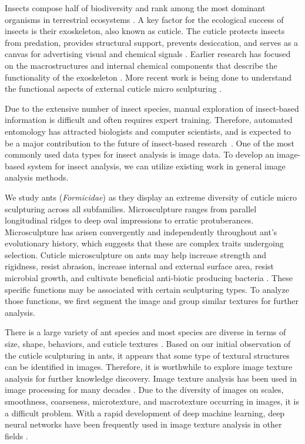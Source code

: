 \documentclass{aci}
\numberwithin{equation}{section}
\begin{document}
Insects compose half of biodiversity and rank among the most dominant organisms
in terrestrial ecosystems \cite{sheikh_diverse_2017}. A key factor for the
ecological success of insects is their exoskeleton, also known as cuticle. The
cuticle protects insects from predation, provides structural support, prevents
desiccation, and serves as a canvas for advertising visual and chemical signals
\cite{gullan_insects_2009}. Earlier research has focused on the macrostructures
and internal chemical components that describe the functionality of the
exoskeleton \cite{gunderson_insect_1989}. More recent work is being done to
understand the functional aspects of external cuticle micro sculpturing
\cite{muthukrishnan_insect_2020, watson_diversity_2017}.

Due to the extensive number of insect species, manual exploration of
insect-based information is difficult and often requires expert training.
Therefore, automated entomology has attracted biologists and computer
scientists, and is expected to be a major contribution to the future of
insect-based research~\cite{martineau_survey_2017}. One of the most commonly
used data types for insect analysis is image data. To develop an image-based
system for insect analysis, we can utilize existing work in general
image analysis methods.

We study ants (\textit{Formicidae}) as they display an extreme diversity of
cuticle micro sculpturing across all subfamilies. Microsculpture ranges from
parallel longitudinal ridges to deep oval impressions to erratic protuberances.
Microsculpture has arisen convergently and independently throughout ant's
evolutionary history, which suggests  that these are complex traits undergoing
selection. Cuticle microsculpture on ants may help increase strength and
rigidness, resist abrasion, increase internal and external surface area, resist
microbial growth, and cultivate beneficial anti-biotic producing bacteria
\cite{johnson_effect_2011, bruckner_relationship_2017, currie_coevolved_2006}.
These specific functions may be associated with certain sculpturing types. To
analyze those functions, we first segment the image and group similar textures
for further analysis.

There is a large variety of ant species and most species are diverse in terms of
size, shape, behaviors, and cuticle textures \cite{harris_glossary_1979}. Based
on our initial observation of the cuticle sculpturing in ants, it appears that
some type of textural structures can be identified in images. Therefore, it is
worthwhile to explore image texture analysis for further knowledge discovery.
Image texture analysis has been used in image processing for many decades
\cite{hung_image_2019}. Due to the diversity of images on scales, smoothness,
coarseness, microtexture, and macrotexture occurring in images, it is a
difficult problem. With a rapid development of deep machine learning, deep
neural networks have been frequently used in image texture analysis in other
fields \cite{sun_robust_2014,liu_bow_2019,liu_pestnet_2019}.
\end{document}
